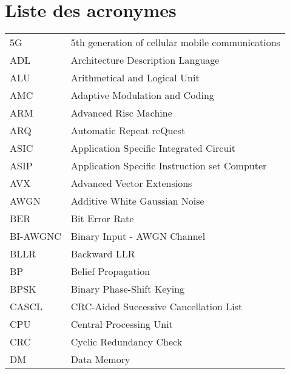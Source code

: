 \chapter*{Liste des acronymes}
\begin{center}

\begin{longtable}{ p{}  p{} } 

5G        & 5th generation of cellular mobile communications       \\
ADL       & Architecture Description Language                      \\
ALU       & Arithmetical and Logical Unit                          \\
AMC       & Adaptive Modulation and Coding                         \\
ARM       & Advanced Risc Machine                                  \\
ARQ       & Automatic Repeat reQuest                               \\
ASIC      & Application Specific Integrated Circuit                \\
ASIP      & Application Specific Instruction set Computer          \\
AVX       & Advanced Vector Extensions                             \\
AWGN      & Additive White Gaussian Noise                          \\
BER       & Bit Error Rate                                         \\
BI-AWGNC  & Binary Input - AWGN Channel                            \\
BLLR      & Backward LLR                                           \\
BP        & Belief Propagation                                     \\
BPSK      & Binary Phase-Shift Keying                              \\
CASCL     & CRC-Aided Successive Cancellation List                 \\
CPU       & Central Processing Unit                                \\
CRC       & Cyclic Redundancy Check                                \\
DM        & Data Memory                                            \\

\end{longtable}
\end{center}
